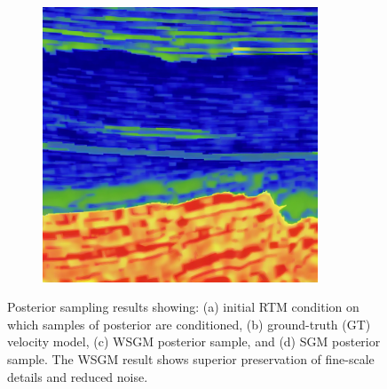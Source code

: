 \documentclass[
]{article}
\begin{document}
\begin{figure}
\begin{minipage}{0.50\linewidth}
\begin{figure}[H]
{\centering \includegraphics[width=0.9\textwidth,height=\textheight]{./figs/imagegen4WSGM.png}

}


\end{figure}%

\end{minipage}%

\caption{\label{fig-composite}Posterior sampling results showing: (a)
initial RTM condition on which samples of posterior are conditioned, (b)
ground-truth (GT) velocity model, (c) WSGM posterior sample, and (d) SGM
posterior sample. The WSGM result shows superior preservation of
fine-scale details and reduced noise.}

\end{figure}%
\end{document}
